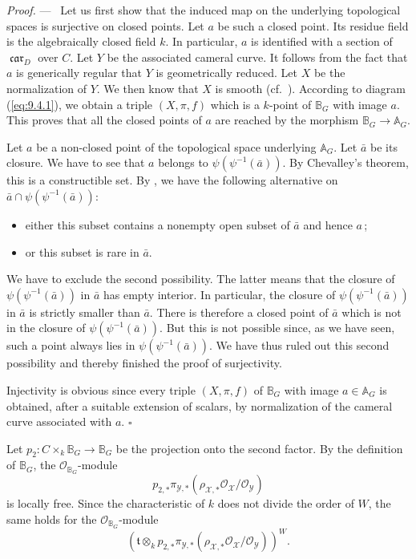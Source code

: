 \documentclass[12pt,a4paper,oneside,english,leqno]{smfart}
\numberwithin{equation}{subsection}
\newcounter{theo}
\numberwithin{theo}{subsection}
\theoremstyle{plain}
\theoremstyle{definition}
\theoremstyle{remark}
\newenvironment{preuve}[1][]{\medskip\noindent\textit{Proof.} #1 ---\ }%
  {\hfill\ensuremath{\square}\medskip}
\DeclareMathOperator{\car}{\mathfrak{car}}
\newcommand{\AAA}{\mathbb{A}}
\newcommand{\BBB}{\mathbb{B}}
\newcommand{\oc}{\mathcal{O}}
\newcommand{\yc}{\mathcal{Y}}
\newcommand{\xc}{\mathcal{X}}
\newcommand{\tgo}{\mathfrak{t}}
\begin{document}
\begin{preuve}
Let us first show that the induced map on the underlying topological spaces is surjective on closed points. Let $a$ be such a closed point. Its residue field is the algebraically closed field $k$. In particular, $a$ is identified with a section of $\car_D$ over $C$. Let $Y$ be the associated cameral curve. It follows from the fact that $a$ is generically regular that $Y$ is geometrically reduced. Let $X$ be the normalization of $Y$. We then know that $X$ is smooth (cf.\ \cite[Prop.\ 17.15.14]{EGAIV4}). According to diagram (\ref{eq:9.4.1}), we obtain a triple $(X,\pi,f)$ which is a $k$-point of $\BBB_G$ with image $a$. This proves that all the closed points of $a$ are reached by the morphism $\BBB_G\to\AAA_G$.

Let $a$ be a non-closed point of the topological space underlying $\AAA_G$. Let $\bar a$ be its closure. We have to see that $a$ belongs to $\psi(\psi^{-1}(\bar a))$. By Chevalley's theorem, this is a constructible set. By \cite[Chap.\ 0, Prop.\ 9.2.3]{EGAIII}, we have the following alternative on $\bar a\cap\psi(\psi^{-1}(\bar a))$:
\begin{itemize}
\item[--] either this subset contains a nonempty open subset of $\bar a$ and hence $a$\,; \item[--] or this subset is rare in $\bar a$.
\end{itemize}
We have to exclude the second possibility. The latter means that the closure of $\psi(\psi^{-1}(\bar a))$ in $\bar a$ has empty interior. In particular, the closure of $\psi(\psi^{-1}(\bar a))$ in $\bar a$ is strictly smaller than $\bar a$. There is therefore a closed point of $\bar a$ which is not in the closure of $\psi(\psi^{-1}(\bar a))$. But this is not possible since, as we have seen, such a point always lies in $\psi(\psi^{-1}(\bar a))$. We have thus ruled out this second possibility and thereby finished the proof of surjectivity.

Injectivity is obvious since every triple $(X,\pi,f)$ of $\BBB_G$ with image $a\in\AAA_G$ is obtained, after a suitable extension of scalars, by normalization of the cameral curve associated with $a$.
\end{preuve}

Let $p_2:C\times_k\BBB_G\to\BBB_G$ be the projection onto the second factor. By the definition of $\BBB_G$, the $\oc_{\BBB_G}$-module
\[
p_{2,*}\pi_{\yc,*}(\rho_{\xc,*}\oc_{\xc}/\oc_{\yc})
\]
is locally free. Since the characteristic of $k$ does not divide the order of $W$, the same holds for the $\oc_{\BBB_G}$-module
\begin{equation}\label{eq:9.4.3}
(\tgo\otimes_k p_{2,*}\pi_{\yc,*}(\rho_{\xc,*}\oc_{\xc}/\oc_{\yc}))^W.
\end{equation}
\end{document}
